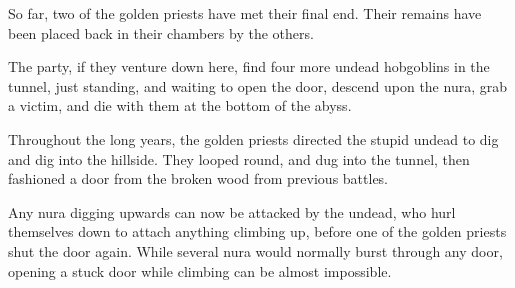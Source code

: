 \begin{multicols}{2}
\begin{exampletext}
So far, two of the golden priests have met their final end.  Their remains have been placed back in their chambers by the others.

\end{exampletext}


The party, if they venture down here, find four more undead hobgoblins in the tunnel, just standing, and waiting to open the door, descend upon the nura, grab a victim, and die with them at the bottom of the abyss.

\begin{exampletext}

  Throughout the long years, the golden priests directed the stupid undead to dig and dig into the hillside.
  They looped round, and dug into the tunnel, then fashioned a door from the broken wood from previous battles.

Any nura digging upwards can now be attacked by the undead, who hurl themselves down to attach anything climbing up, before one of the golden priests shut the door again.
While several nura would normally burst through any door, opening a stuck door while climbing can be almost impossible.

\end{exampletext}

\end{multicols}

